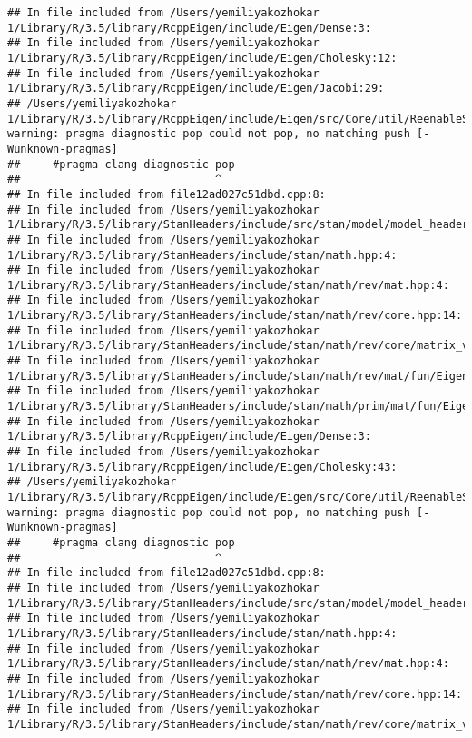 \documentclass[]{article}
\begin{document}
\begin{verbatim}
## In file included from /Users/yemiliyakozhokar 1/Library/R/3.5/library/RcppEigen/include/Eigen/Dense:3:
## In file included from /Users/yemiliyakozhokar 1/Library/R/3.5/library/RcppEigen/include/Eigen/Cholesky:12:
## In file included from /Users/yemiliyakozhokar 1/Library/R/3.5/library/RcppEigen/include/Eigen/Jacobi:29:
## /Users/yemiliyakozhokar 1/Library/R/3.5/library/RcppEigen/include/Eigen/src/Core/util/ReenableStupidWarnings.h:10:30: warning: pragma diagnostic pop could not pop, no matching push [-Wunknown-pragmas]
##     #pragma clang diagnostic pop
##                              ^
## In file included from file12ad027c51dbd.cpp:8:
## In file included from /Users/yemiliyakozhokar 1/Library/R/3.5/library/StanHeaders/include/src/stan/model/model_header.hpp:4:
## In file included from /Users/yemiliyakozhokar 1/Library/R/3.5/library/StanHeaders/include/stan/math.hpp:4:
## In file included from /Users/yemiliyakozhokar 1/Library/R/3.5/library/StanHeaders/include/stan/math/rev/mat.hpp:4:
## In file included from /Users/yemiliyakozhokar 1/Library/R/3.5/library/StanHeaders/include/stan/math/rev/core.hpp:14:
## In file included from /Users/yemiliyakozhokar 1/Library/R/3.5/library/StanHeaders/include/stan/math/rev/core/matrix_vari.hpp:4:
## In file included from /Users/yemiliyakozhokar 1/Library/R/3.5/library/StanHeaders/include/stan/math/rev/mat/fun/Eigen_NumTraits.hpp:4:
## In file included from /Users/yemiliyakozhokar 1/Library/R/3.5/library/StanHeaders/include/stan/math/prim/mat/fun/Eigen.hpp:4:
## In file included from /Users/yemiliyakozhokar 1/Library/R/3.5/library/RcppEigen/include/Eigen/Dense:3:
## In file included from /Users/yemiliyakozhokar 1/Library/R/3.5/library/RcppEigen/include/Eigen/Cholesky:43:
## /Users/yemiliyakozhokar 1/Library/R/3.5/library/RcppEigen/include/Eigen/src/Core/util/ReenableStupidWarnings.h:10:30: warning: pragma diagnostic pop could not pop, no matching push [-Wunknown-pragmas]
##     #pragma clang diagnostic pop
##                              ^
## In file included from file12ad027c51dbd.cpp:8:
## In file included from /Users/yemiliyakozhokar 1/Library/R/3.5/library/StanHeaders/include/src/stan/model/model_header.hpp:4:
## In file included from /Users/yemiliyakozhokar 1/Library/R/3.5/library/StanHeaders/include/stan/math.hpp:4:
## In file included from /Users/yemiliyakozhokar 1/Library/R/3.5/library/StanHeaders/include/stan/math/rev/mat.hpp:4:
## In file included from /Users/yemiliyakozhokar 1/Library/R/3.5/library/StanHeaders/include/stan/math/rev/core.hpp:14:
## In file included from /Users/yemiliyakozhokar 1/Library/R/3.5/library/StanHeaders/include/stan/math/rev/core/matrix_vari.hpp:4:

\end{verbatim}
\end{document}
